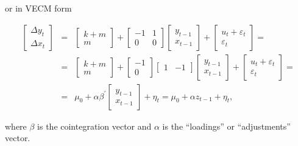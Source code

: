       or in VECM form
      
\renewcommand{\arraystretch}{1.3}
\setlength{\arraycolsep}{.05in}
\begin{eqnarray*}
  \left[  \begin{array}{c} \Delta y_t \\ \Delta x_t \end{array} \right]  & = & 
    \left[  \begin{array}{c} k + m \\ m \end{array} \right] +
    \left[  \begin{array}{rr} -1 & 1 \\ 0 & 0 \end{array} \right] 
    \left[  \begin{array}{c} y_{t-1} \\ x_{t-1} \end{array} \right] + 
    \left[  \begin{array}{c} u_t + \varepsilon_t \\ \varepsilon_t \end{array} \right] = \\
  & = & 
    \left[  \begin{array}{c} k + m \\ m \end{array} \right] +
    \left[  \begin{array}{r} -1 \\ 0 \end{array} \right]
    \left[  \begin{array}{rr} 1 & -1 \end{array} \right] 
    \left[  \begin{array}{c} y_{t-1} \\ x_{t-1} \end{array} \right] + 
    \left[  \begin{array}{c} u_t + \varepsilon_t \\ \varepsilon_t \end{array} \right] = \\
  & = & 
    \mu_0 + \alpha \beta^{\prime} \left[  \begin{array}{c} y_{t-1} \\ x_{t-1} \end{array} \right] + \eta_t = 
    \mu_0 + \alpha z_{t-1} + \eta_t ,
\end{eqnarray*}
	
      where $\beta$ is the cointegration vector and $\alpha$ is the
      ``loadings'' or ``adjustments'' vector.
     
